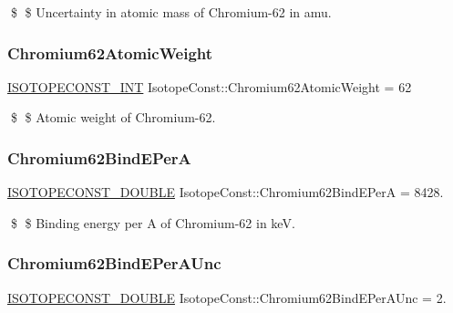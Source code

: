 \$ \$ Uncertainty in atomic mass of Chromium-\/62 in amu. \mbox{\label{group___isotope_const-_chromium-_cr62_ga8a23931f36d4f86ef7d3d39a54fdb619}} 
\subsubsection{\texorpdfstring{Chromium62\+Atomic\+Weight}{Chromium62AtomicWeight}}
{\footnotesize\ttfamily \mbox{\hyperlink{group___isotope_const-_macros_ga5f18360b3e99483a35c32d789e62621c}{I\+S\+O\+T\+O\+P\+E\+C\+O\+N\+S\+T\+\_\+\+I\+NT}} Isotope\+Const\+::\+Chromium62\+Atomic\+Weight = 62}

\$ \$ Atomic weight of Chromium-\/62. \mbox{\label{group___isotope_const-_chromium-_cr62_gacafb3b7068625cca8a4babd22e84aee5}} 
\subsubsection{\texorpdfstring{Chromium62\+Bind\+E\+PerA}{Chromium62BindEPerA}}
{\footnotesize\ttfamily \mbox{\hyperlink{group___isotope_const-_macros_ga8f45a7272ce02c0b4c65c44636ed719a}{I\+S\+O\+T\+O\+P\+E\+C\+O\+N\+S\+T\+\_\+\+D\+O\+U\+B\+LE}} Isotope\+Const\+::\+Chromium62\+Bind\+E\+PerA = 8428.}

\$ \$ Binding energy per A of Chromium-\/62 in keV. \mbox{\label{group___isotope_const-_chromium-_cr62_ga68211ecadf21700563aaa3c9c887353b}} 
\subsubsection{\texorpdfstring{Chromium62\+Bind\+E\+Per\+A\+Unc}{Chromium62BindEPerAUnc}}
{\footnotesize\ttfamily \mbox{\hyperlink{group___isotope_const-_macros_ga8f45a7272ce02c0b4c65c44636ed719a}{I\+S\+O\+T\+O\+P\+E\+C\+O\+N\+S\+T\+\_\+\+D\+O\+U\+B\+LE}} Isotope\+Const\+::\+Chromium62\+Bind\+E\+Per\+A\+Unc = 2.}

